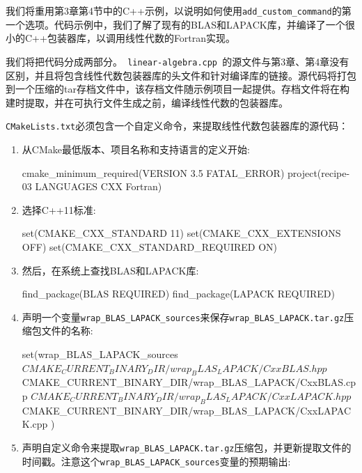 
我们将重用第3章第4节中的C++示例，以说明如何使用\texttt{add\_custom\_command}的第一个选项。代码示例中，我们了解了现有的BLAS和LAPACK库，并编译了一个很小的C++包装器库，以调用线性代数的Fortran实现。

我们将把代码分成两部分。\texttt{ linear-algebra.cpp }的源文件与第3章、第4章没有区别，并且将包含线性代数包装器库的头文件和针对编译库的链接。源代码将打包到一个压缩的tar存档文件中，该存档文件随示例项目一起提供。存档文件将在构建时提取，并在可执行文件生成之前，编译线性代数的包装器库。


\texttt{CMakeLists.txt}必须包含一个自定义命令，来提取线性代数包装器库的源代码：

\begin{enumerate}
\item 从CMake最低版本、项目名称和支持语言的定义开始:

\begin{codebox}[cmake]
cmake_minimum_required(VERSION 3.5 FATAL_ERROR)
project(recipe-03 LANGUAGES CXX Fortran)
\end{codebox}

\item 选择C++11标准:

\begin{codebox}[cmake]
set(CMAKE_CXX_STANDARD 11)
set(CMAKE_CXX_EXTENSIONS OFF)
set(CMAKE_CXX_STANDARD_REQUIRED ON)
\end{codebox}

\item 然后，在系统上查找BLAS和LAPACK库:

\begin{codebox}[cmake]
find_package(BLAS REQUIRED)
find_package(LAPACK REQUIRED)
\end{codebox}

\item 声明一个变量\texttt{wrap\_BLAS\_LAPACK\_sources}来保存\texttt{wrap\_BLAS\_LAPACK.tar.gz}压缩包文件的名称:

\begin{codebox}[cmake]
set(wrap_BLAS_LAPACK_sources
  ${CMAKE_CURRENT_BINARY_DIR}/wrap_BLAS_LAPACK/CxxBLAS.hpp
  ${CMAKE_CURRENT_BINARY_DIR}/wrap_BLAS_LAPACK/CxxBLAS.cpp
  ${CMAKE_CURRENT_BINARY_DIR}/wrap_BLAS_LAPACK/CxxLAPACK.hpp
  ${CMAKE_CURRENT_BINARY_DIR}/wrap_BLAS_LAPACK/CxxLAPACK.cpp
  )
\end{codebox}

\item 声明自定义命令来提取\texttt{wrap\_BLAS\_LAPACK.tar.gz}压缩包，并更新提取文件的时间戳。注意这个\texttt{wrap\_BLAS\_LAPACK\_sources}变量的预期输出:


\end{enumerate}

